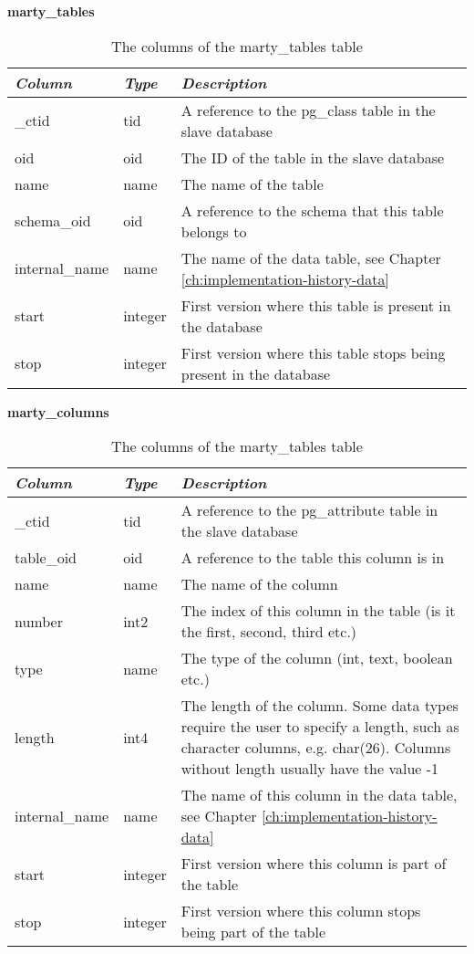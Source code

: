 \begin{table}[h]
  \centering
  \textbf{marty\_tables}
  \begin{tabularx}{\textwidth}{llX}
    \textit{Column} & \textit{Type} & \textit{Description} \\
    \midrule
    \_ctid & tid & A reference to the pg\_class table in the slave database \\
    oid & oid & The ID of the table in the slave database \\
    name & name & The name of the table \\
    schema\_oid & oid & A reference to the schema that this table belongs to \\
    internal\_name & name & The name of the data table, see Chapter \ref{ch:implementation-history-data} \\
    start & integer & First version where this table is present in the database \\
    stop & integer & First version where this table stops being present in the database \\
  \end{tabularx}
  \caption{The columns of the marty\_tables table}
  \label{tbl:marty-tables}
\end{table}

\begin{table}[h]
  \centering
  \textbf{marty\_columns}
  \begin{tabularx}{\textwidth}{llX}
    \textit{Column} & \textit{Type} & \textit{Description} \\
    \midrule
    \_ctid & tid & A reference to the pg\_attribute table in the slave database \\
    table\_oid & oid & A reference to the table this column is in \\
    name & name & The name of the column \\
    number & int2 & The index of this column in the table (is it the first, second, third etc.) \\
    type & name & The type of the column (int, text, boolean etc.) \\
    length & int4 & The length of the column. Some data types require the user to specify a length, such as character columns, e.g. char(26). Columns without length usually have the value -1 \\
    internal\_name & name & The name of this column in the data table, see Chapter \ref{ch:implementation-history-data} \\
    start & integer & First version where this column is part of the table \\
    stop & integer & First version where this column stops being part of the table \\
  \end{tabularx}
  \caption{The columns of the marty\_tables table}
  \label{tbl:marty-columns}
\end{table}

